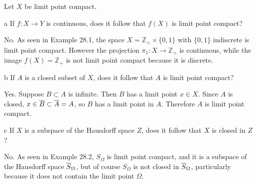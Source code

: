 \documentclass[11pt]{article}
\begin{document}



\begin{ex}{28.3}
  Let $X$ be limit point compact.
\end{ex}

\begin{p}{a}
  If $f: X \to Y$ is continuous, does it follow that $f(X)$ is limit point
  compact?
\end{p}

\begin{solution}
  No. As seen in Example 28.1, the space $X = \mathbb{Z}_+ \times \{0, 1\}$ with
  $\{0, 1\}$ indiscrete is limit point compact. However the projection $\pi_1: X
  \to \mathbb{Z}_+$ is continuous, while the image $f(X) = \mathbb{Z}_+$ is not limit point
  compact because it is discrete.
\end{solution}

\begin{p}{b}
  If $A$ is a closed subset of $X$, does it follow that $A$ is limit point
  compact?
\end{p}
\begin{solution}
  Yes. Suppose $B \subset A$ is infinite. Then $B$ has a limit point $x \in X$.
  Since $A$ is closed, $x \in { \overline{B} } \subset { \overline{A} } = A$, so $B$ has a limit point
  in $A$. Therefore $A$ is limit point compact.
\end{solution}

\begin{p}{c}
  If $X$ is a subspace of the Hausdorff space $Z$, does it follow that $X$ is
  closed in $Z$?
\end{p}
\begin{solution}
  No. As seen in Example 28.2, $S_\Omega$ is limit point compact, and it is a
  subspace of the Hausdorff space ${ \overline{S} }_\Omega$, but of course $S_\Omega$ is
  not closed in ${ \overline{S} }_\Omega$, particularly because it does not contain the
  limit point $\Omega$.
\end{solution}
\end{document}
